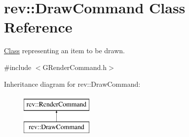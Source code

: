 \hypertarget{classrev_1_1_draw_command}{}\section{rev\+::Draw\+Command Class Reference}
\label{classrev_1_1_draw_command}


\mbox{\hyperlink{struct_class}{Class}} representing an item to be drawn.  




{\ttfamily \#include $<$G\+Render\+Command.\+h$>$}

Inheritance diagram for rev\+::Draw\+Command\+:\begin{figure}[H]
\begin{center}
\leavevmode
\includegraphics[height=2.000000cm]{classrev_1_1_draw_command}
\end{center}
\end{figure}
